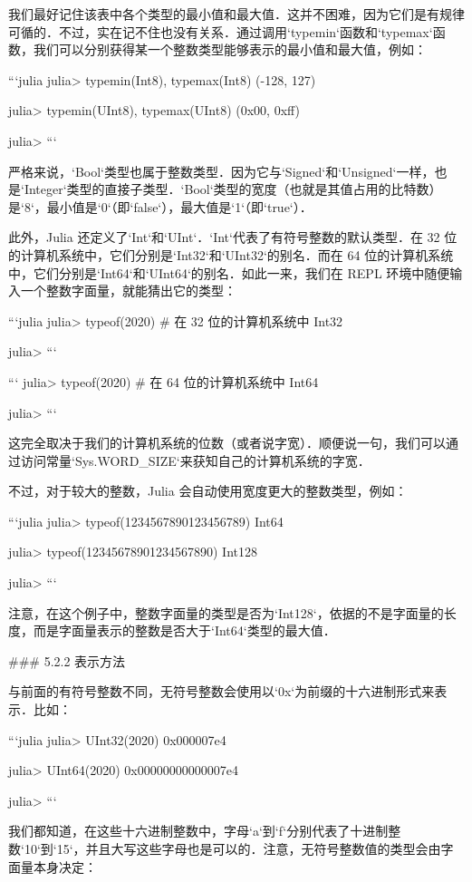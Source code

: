 我们最好记住该表中各个类型的最小值和最大值．这并不困难，因为它们是有规律可循的．不过，实在记不住也没有关系．通过调用`typemin`函数和`typemax`函数，我们可以分别获得某一个整数类型能够表示的最小值和最大值，例如：

```julia
julia> typemin(Int8), typemax(Int8)
(-128, 127)

julia> typemin(UInt8), typemax(UInt8)
(0x00, 0xff)

julia> 
```

严格来说，`Bool`类型也属于整数类型．因为它与`Signed`和`Unsigned`一样，也是`Integer`类型的直接子类型．`Bool`类型的宽度（也就是其值占用的比特数）是`8`，最小值是`0`（即`false`），最大值是`1`（即`true`）．

此外，Julia 还定义了`Int`和`UInt`．`Int`代表了有符号整数的默认类型．在 32 位的计算机系统中，它们分别是`Int32`和`UInt32`的别名．而在 64 位的计算机系统中，它们分别是`Int64`和`UInt64`的别名．如此一来，我们在 REPL 环境中随便输入一个整数字面量，就能猜出它的类型：

```julia
julia> typeof(2020) # 在 32 位的计算机系统中 
Int32 

julia> 
```

```
julia> typeof(2020) # 在 64 位的计算机系统中 
Int64

julia> 
```

这完全取决于我们的计算机系统的位数（或者说字宽）．顺便说一句，我们可以通过访问常量`Sys.WORD_SIZE`来获知自己的计算机系统的字宽．

不过，对于较大的整数，Julia 会自动使用宽度更大的整数类型，例如：

```julia
julia> typeof(1234567890123456789)
Int64

julia> typeof(12345678901234567890)
Int128

julia> 
```

注意，在这个例子中，整数字面量的类型是否为`Int128`，依据的不是字面量的长度，而是字面量表示的整数是否大于`Int64`类型的最大值．

### 5.2.2 表示方法

与前面的有符号整数不同，无符号整数会使用以`0x`为前缀的十六进制形式来表示．比如：

```julia
julia> UInt32(2020)
0x000007e4

julia> UInt64(2020)
0x00000000000007e4

julia> 
```

我们都知道，在这些十六进制整数中，字母`a`到`f`分别代表了十进制整数`10`到`15`，并且大写这些字母也是可以的．注意，无符号整数值的类型会由字面量本身决定：

